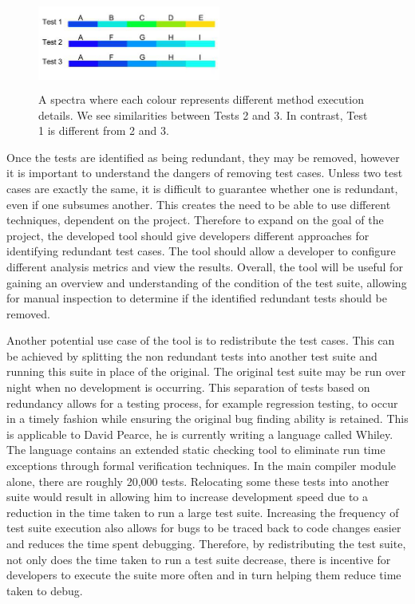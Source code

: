 \begin{figure}[h]
\centering
\includegraphics[width=6cm,height=3cm]{spectra.png}
\caption{A spectra where each colour represents different method execution details. We see similarities between Tests 2 and 3. In contrast, Test 1 is different from 2 and 3. }
\label{fig:spectra}
\end{figure}

Once the tests are identified as being redundant, they may be removed, however it is important to understand the dangers of removing test cases. Unless two test cases are exactly the same, it is difficult to guarantee whether one is redundant, even if one subsumes another. This creates the need to be able to use different techniques, dependent on the project. Therefore to expand on the goal of the project, the developed tool should give developers different approaches for identifying redundant test cases. The tool should allow a developer to configure different analysis metrics and view the results. Overall, the tool will be useful for gaining an overview and understanding of the condition of the test suite, allowing for manual inspection to determine if the identified redundant tests should be removed.

Another potential use case of the tool is to redistribute the test cases. This can be achieved by splitting the non redundant tests into another test suite and running this suite in place of the original. The original test suite may be run over night when no development is occurring. This separation of tests based on redundancy allows for a testing process, for example regression testing, to occur in a timely fashion while ensuring the original bug finding ability is retained. This is applicable to David Pearce, he is currently writing a language called Whiley. The language contains an extended static checking tool to eliminate run time exceptions through formal verification techniques. In the main compiler module alone, there are roughly 20,000 tests. Relocating some these tests into another suite would result in allowing him to increase development speed due to a reduction in the time taken to run a large test suite. Increasing the frequency of test suite execution also allows for bugs to be traced back to code changes easier and reduces the time spent debugging. Therefore, by redistributing the test suite, not only does the time taken to run a test suite decrease, there is incentive for developers to execute the suite more often and in turn helping them reduce time taken to debug.

